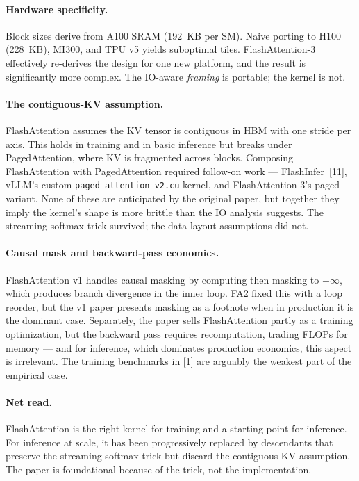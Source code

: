 \documentclass{article}
\begin{document}
\paragraph{Hardware specificity.} Block sizes derive from A100 SRAM (192~KB per SM). Naive porting to H100 (228~KB), MI300, and TPU v5 yields suboptimal tiles. FlashAttention-3 effectively re-derives the design for one new platform, and the result is significantly more complex. The IO-aware \emph{framing} is portable; the kernel is not.

\paragraph{The contiguous-KV assumption.} FlashAttention assumes the KV tensor is contiguous in HBM with one stride per axis. This holds in training and in basic inference but breaks under PagedAttention, where KV is fragmented across blocks. Composing FlashAttention with PagedAttention required follow-on work --- FlashInfer~[11], vLLM's custom \texttt{paged\_attention\_v2.cu} kernel, and FlashAttention-3's paged variant. None of these are anticipated by the original paper, but together they imply the kernel's shape is more brittle than the IO analysis suggests. The streaming-softmax trick survived; the data-layout assumptions did not.

\paragraph{Causal mask and backward-pass economics.} FlashAttention v1 handles causal masking by computing then masking to $-\infty$, which produces branch divergence in the inner loop. FA2 fixed this with a loop reorder, but the v1 paper presents masking as a footnote when in production it is the dominant case. Separately, the paper sells FlashAttention partly as a training optimization, but the backward pass requires recomputation, trading FLOPs for memory --- and for inference, which dominates production economics, this aspect is irrelevant. The training benchmarks in [1] are arguably the weakest part of the empirical case.

\paragraph{Net read.} FlashAttention is the right kernel for training and a starting point for inference. For inference at scale, it has been progressively replaced by descendants that preserve the streaming-softmax trick but discard the contiguous-KV assumption. The paper is foundational because of the trick, not the implementation.
\end{document}
